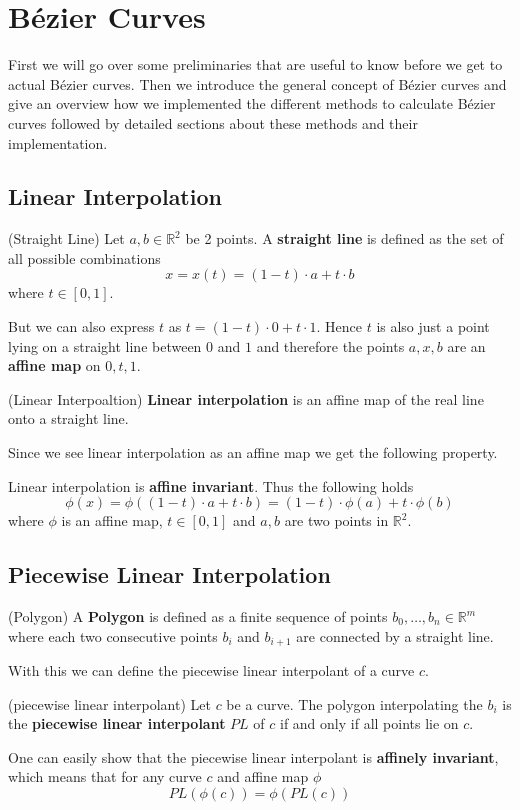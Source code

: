 \section{Bézier Curves}
First we will go over some preliminaries that are useful to know before we get to actual Bézier curves. Then we introduce the general concept of Bézier curves and give an overview how we implemented the different methods to calculate Bézier curves followed by detailed sections about these methods and their implementation.
\subsection{Linear Interpolation}
\begin{definition}(Straight Line)
Let $a, b \in \mathbb{R}^2$ be 2 points. A \textbf{straight line} is defined as the set of all possible combinations
\[x = x(t) = (1-t) \cdot a + t \cdot b\]
where $t \in [0,1]$.
\end{definition}
But we can also express $t$ as $t=(1-t) \cdot 0 + t \cdot 1$. Hence $t$ is also just a point lying on a straight line between $0$ and $1$ and therefore the points $a,x,b$ are an \textbf{affine map} on $0,t,1$.
\begin{definition}(Linear Interpoaltion)
\textbf{Linear interpolation} is an affine map of the real line onto a straight line.
\end{definition}
Since we see linear interpolation as an affine map we get the following property.
\begin{definition}
Linear interpolation is \textbf{affine invariant}. Thus the following holds
\[\phi(x) = \phi((1-t) \cdot a + t \cdot b) = (1-t) \cdot \phi(a) + t \cdot \phi(b)\]
where $\phi$ is an affine map, $t \in [0,1]$ and $a,b$ are two points in $\mathbb{R}^2$.
\end{definition}


\subsection{Piecewise Linear Interpolation}
\begin{definition}(Polygon)
A \textbf{Polygon} is defined as a finite sequence of points $b_0,\dots,b_n \in \mathbb{R}^m$ where each two consecutive points $b_i$ and $b_{i+1}$ are connected by a straight line.\\
\end{definition}
With this we can define the piecewise linear interpolant of a curve $c$.
\begin{definition}(piecewise linear interpolant)
Let $c$ be a curve. The polygon interpolating the $b_i$ is the \textbf{piecewise linear interpolant} $PL$ of $c$ if and only if all points lie on $c$.
\end{definition}
\begin{rem}
One can easily show that the piecewise linear interpolant is \textbf{affinely invariant}, which means that for any curve $c$ and affine map $\phi$
\[
PL(\phi(c)) = \phi(PL(c))
\]
\end{rem}


